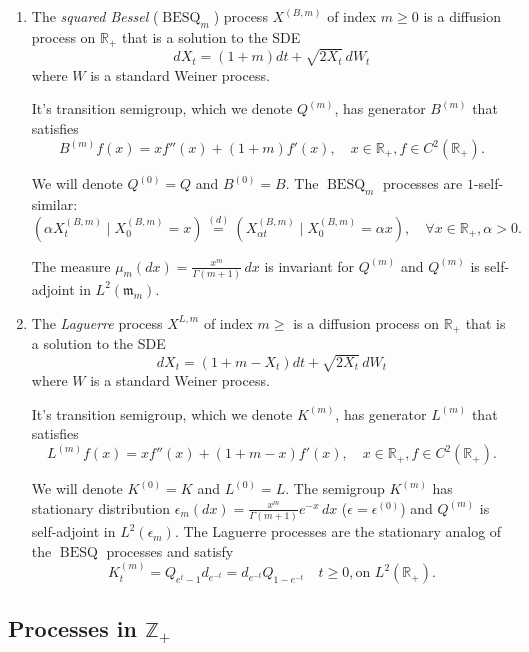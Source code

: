 \documentclass[11pt,a4,reqno]{amsart}
\numberwithin{equation}{section}
\theoremstyle{definition}
\theoremstyle{remark}
\newcommand{\bb}[1]{\mathbb{#1}}
\newcommand{\frk}[1]{\mathfrak{#1}}
\newcommand{\R}{\bb{R}}
\newcommand{\Z}{\bb{Z}}
\DeclareMathOperator{\besq}{BESQ}
\newcommand{\beq}{\begin{equation}}
\newcommand{\eeq}{\end{equation}}
\begin{document}
	\begin{enumerate}
	
		\item The \textit{squared Bessel} ($\besq_m$) process $X^{(B, m)}$ of index $m \geq 0$ is a diffusion process on $\R_+$ that is a solution to the SDE
		\beq dX_t = (1 + m) dt + \sqrt{2X_t} \, dW_t \eeq
		where $W$ is a standard Weiner process. 
		
		It's transition semigroup, which we denote $Q^{(m)}$, has generator $B^{(m)}$ that satisfies
		\beq B^{(m)}f(x) = x f''(x) + (1 + m) f'(x), \quad x \in \R_+, f \in C^2(\R_+). \eeq
		
		We will denote $Q^{(0)} = Q$ and $B^{(0)} = B$. The $\besq_m$ processes are $1$-self-similar:
		\beq \label{eqn:self_similar_besq} ( \alpha X_t^{(B, m)} \mid X_0^{(B, m)} = x) \overset{(d)}{=} (X_{\alpha t}^{(B, m)} \mid X_0^{(B, m)} = \alpha x), \quad \forall x \in \R_+, \alpha > 0 . \eeq
		
		The measure $\mu_m(dx) = \frac{x^m}{\Gamma(m + 1)} \, dx$ is invariant for $Q^{(m)}$ and $Q^{(m)}$ is self-adjoint in $L^2(\frk{m}_m)$.
		
		\item The \textit{Laguerre} process $X^{L, m}$ of index $m \geq $ is a diffusion process on $\R_+$ that is a solution to the SDE 
		\beq dX_t = (1 + m - X_t) dt + \sqrt{2X_t} \, dW_t \eeq
		where $W$ is a standard Weiner process. 
		
		It's transition semigroup, which we denote $K^{(m)}$, has generator $L^{(m)}$ that satisfies
		\beq L^{(m)}f(x) = x f''(x) + (1 + m - x) f'(x), \quad x \in \R_+, f \in C^2(\R_+). \eeq
		
		We will denote $K^{(0)} = K$ and $L^{(0)} = L$. The semigroup $K^{(m)}$ has stationary distribution $\epsilon_m(dx) = \frac{x^m}{\Gamma(m + 1)} e^{-x} \, dx$ ($\epsilon = \epsilon^{(0)}$) and $Q^{(m)}$ is self-adjoint in $L^2(\epsilon_m)$. The Laguerre processes are the stationary analog of the $\besq$ processes and satisfy 
		\beq \label{eqn:besq_lag} K^{(m)}_t = Q_{e^t - 1} d_{e^{-t}} = d_{e^{-t}} Q_{1 - e^{-t}} \quad t \geq 0, \text{on } L^2(\R_+) . \eeq
		
	\end{enumerate}
	
	
\subsection{Processes in $\Z_+$}
\end{document}
